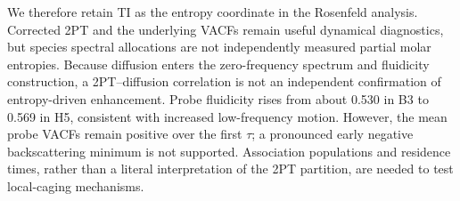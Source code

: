 We therefore retain TI as the entropy coordinate in the Rosenfeld analysis. Corrected 2PT and the underlying VACFs remain useful dynamical diagnostics, but species spectral allocations are not independently measured partial molar entropies. Because diffusion enters the zero-frequency spectrum and fluidicity construction, a 2PT--diffusion correlation is not an independent confirmation of entropy-driven enhancement. Probe fluidicity rises from about 0.530 in B3 to 0.569 in H5, consistent with increased low-frequency motion. However, the mean probe VACFs remain positive over the first $\tau$; a pronounced early negative backscattering minimum is not supported. Association populations and residence times, rather than a literal interpretation of the 2PT partition, are needed to test local-caging mechanisms.
